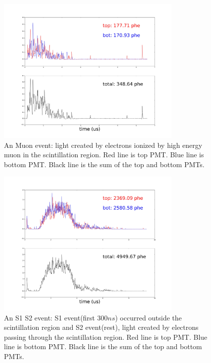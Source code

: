 \begin{center}
\begin{figure}[!htbp]
  \centering
  \includegraphics[width=0.8\textwidth,clip,trim={0 0 0 0}]
  {Figures/Ch10/SampleWaveforms/_64767_a_+6_0_g_-6_0_Cut33_big_pulse_PlotCoinWaveforms_1_.jpg}
  \caption{An Muon event: light created by electrons ionized by high energy muon in the scintillation region. Red line is top PMT. Blue line is bottom PMT. Black line is the sum of the top and bottom PMTs.}
  \label{fig: Muon}
\end{figure}
\end{center}

\begin{center}
\begin{figure}[!htbp]
  \centering
  \includegraphics[width=0.8\textwidth,clip,trim={0 0 0 0}]
  {Figures/Ch10/SampleWaveforms/_64767_a_+6_0_g_-6_0_Cut33_big_pulse_PlotCoinWaveforms_84_.jpg}
  \caption{An S1 S2 event: S1 event(first $300 ns$) occurred outside the scintillation region and S2 event(rest), light created by electrons passing through the scintillation region. Red line is top PMT. Blue line is bottom PMT. Black line is the sum of the top and bottom PMTs. }
  \label{fig: S1 S2}
\end{figure}
\end{center}

